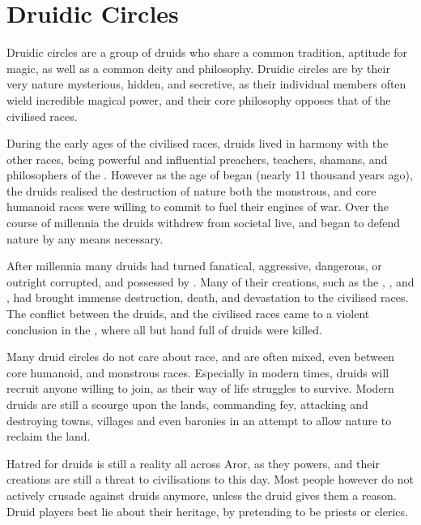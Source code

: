 \section{Druidic Circles}
\label{sec:Druidic Circle}

Druidic circles are a group of druids who share a common tradition, aptitude
for magic, as well as a common deity and philosophy. Druidic circles are by
their very nature mysterious, hidden, and secretive, as their individual
members often wield incredible magical power, and their core philosophy
opposes that of the civilised races.

During the early ages of the civilised races, druids lived in harmony with
the other races, being powerful and influential preachers, teachers, shamans,
and philosophers of the . However as the age of
 began (nearly 11 thousand years ago), the druids realised
the destruction of nature both the monstrous, and core humanoid races were
willing to commit to fuel their engines of war. Over the course of millennia
the druids withdrew from societal live, and began to defend nature by any
means necessary.

After millennia many druids had turned fanatical, aggressive, dangerous, or
outright corrupted, and possessed by . Many of their
creations, such as the , , and
, had brought immense destruction, death, and
devastation to the civilised races. The conflict between the druids, and
the civilised races came to a violent conclusion in the , where all but hand full of druids were killed.

Many druid circles do not care about race, and are often mixed, even between
core humanoid, and monstrous races. Especially in modern times, druids will
recruit anyone willing to join, as their way of life struggles to survive.
Modern druids are still a scourge upon the lands, commanding fey, attacking
and destroying towns, villages and even baronies in an attempt to allow
nature to reclaim the land.

\begin{note}
  Hatred for druids is still a reality all across Aror, as they powers, and
  their creations are still a threat to civilisations to this day. Most
  people however do not actively crusade against druids anymore, unless the
  druid gives them a reason. Druid players best lie about their heritage,
  by pretending to be priests or clerics.
\end{note}

